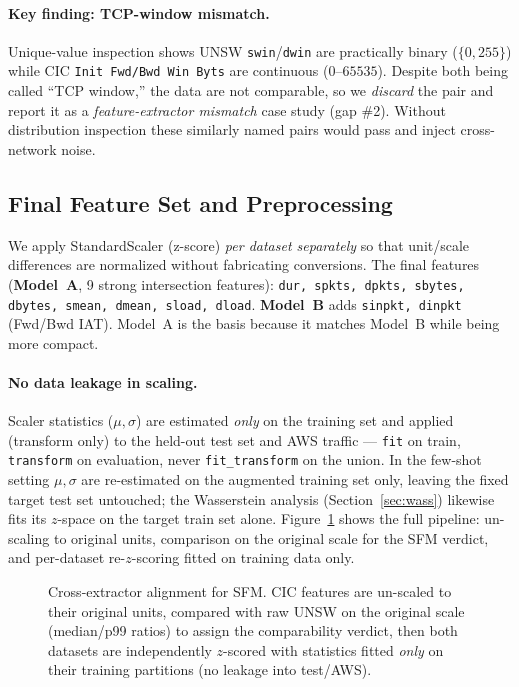 \documentclass[preprint,12pt,authoryear]{elsarticle}
\begin{document}
\paragraph{Key finding: TCP-window mismatch.} Unique-value inspection shows UNSW
\texttt{swin}/\texttt{dwin} are practically binary ($\{0,255\}$) while CIC
\texttt{Init Fwd/Bwd Win Byts} are continuous ($0$--$65535$). Despite both being
called ``TCP window,'' the data are not comparable, so we \emph{discard} the pair and
report it as a \emph{feature-extractor mismatch} case study (gap \#2). Without
distribution inspection these similarly named pairs would pass and inject
cross-network noise.

\subsection{Final Feature Set and Preprocessing}
We apply StandardScaler (z-score) \emph{per dataset separately} so that
unit/scale differences are normalized without fabricating conversions. The final
features (\textbf{Model~A}, 9 strong intersection features): \texttt{dur, spkts,
dpkts, sbytes, dbytes, smean, dmean, sload, dload}. \textbf{Model~B} adds
\texttt{sinpkt, dinpkt} (Fwd/Bwd IAT). Model~A is the basis because it matches
Model~B while being more compact.

\paragraph{No data leakage in scaling.} Scaler statistics ($\mu,\sigma$) are
estimated \emph{only} on the training set and applied (transform only) to the
held-out test set and AWS traffic --- \texttt{fit} on train, \texttt{transform} on
evaluation, never \texttt{fit\_transform} on the union. In the few-shot setting
$\mu,\sigma$ are re-estimated on the augmented training set only, leaving the fixed
target test set untouched; the Wasserstein analysis (Section~\ref{sec:wass})
likewise fits its $z$-space on the target train set alone. Figure~\ref{fig:unscaling}
shows the full pipeline: un-scaling to original units, comparison on the original
scale for the SFM verdict, and per-dataset re-$z$-scoring fitted on training data
only.

\begin{figure}[htbp]
\centering
\resizebox{0.95\linewidth}{!}{}
\caption{Cross-extractor alignment for SFM. CIC features are un-scaled to their
original units, compared with raw UNSW on the original scale (median/p99 ratios) to
assign the comparability verdict, then both datasets are independently
$z$-scored with statistics fitted \emph{only} on their training partitions
(no leakage into test/AWS).}
\label{fig:unscaling}
\end{figure}
\end{document}
